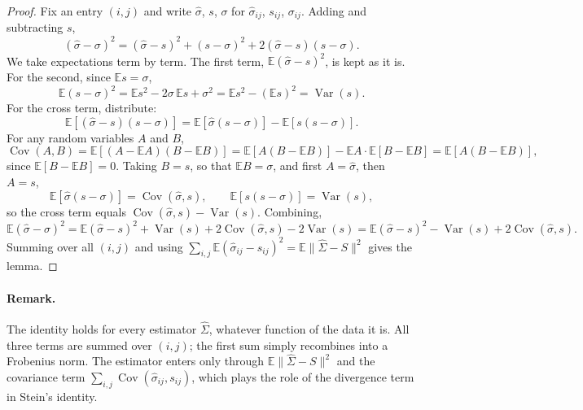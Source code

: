 \begin{proof}
Fix an entry $(i,j)$ and write $\hat\sigma$, $s$, $\sigma$ for $\hat\sigma_{ij}$, $s_{ij}$, $\sigma_{ij}$. Adding and subtracting $s$,
\[
  (\hat\sigma - \sigma)^2
  = (\hat\sigma - s)^2 + (s - \sigma)^2 + 2(\hat\sigma - s)(s - \sigma).
\]
We take expectations term by term. The first term, $\mathbb{E}(\hat\sigma - s)^2$, is kept as it is. For the second, since $\mathbb{E}s = \sigma$,
\[
  \mathbb{E}(s-\sigma)^2 = \mathbb{E}s^2 - 2\sigma\,\mathbb{E}s + \sigma^2 = \mathbb{E}s^2 - (\mathbb{E}s)^2 = \operatorname{Var}(s).
\]
For the cross term, distribute:
\[
  \mathbb{E}\left[(\hat\sigma - s)(s - \sigma)\right]
  = \mathbb{E}\left[\hat\sigma(s-\sigma)\right] - \mathbb{E}\left[s(s-\sigma)\right].
\]
For any random variables $A$ and $B$,
\[
  \operatorname{Cov}(A,B) = \mathbb{E}\left[(A - \mathbb{E}A)(B - \mathbb{E}B)\right]
  = \mathbb{E}\left[A(B - \mathbb{E}B)\right] - \mathbb{E}A \cdot \mathbb{E}\left[B - \mathbb{E}B\right]
  = \mathbb{E}\left[A(B - \mathbb{E}B)\right],
\]
since $\mathbb{E}[B - \mathbb{E}B] = 0$. Taking $B = s$, so that $\mathbb{E}B = \sigma$, and first $A = \hat\sigma$, then $A = s$,
\[
  \mathbb{E}\left[\hat\sigma(s-\sigma)\right] = \operatorname{Cov}(\hat\sigma, s),
  \qquad
  \mathbb{E}\left[s(s-\sigma)\right] = \operatorname{Var}(s),
\]
so the cross term equals $\operatorname{Cov}(\hat\sigma, s) - \operatorname{Var}(s)$. Combining,
\[
  \mathbb{E}(\hat\sigma - \sigma)^2
  = \mathbb{E}(\hat\sigma - s)^2 + \operatorname{Var}(s) + 2\operatorname{Cov}(\hat\sigma, s) - 2\operatorname{Var}(s)
  = \mathbb{E}(\hat\sigma - s)^2 - \operatorname{Var}(s) + 2\operatorname{Cov}(\hat\sigma, s).
\]
Summing over all $(i,j)$ and using $\sum_{i,j}\mathbb{E}(\hat\sigma_{ij} - s_{ij})^2 = \mathbb{E}\|\hat\Sigma - S\|^2$ gives the lemma.
\end{proof}

\paragraph{Remark.}
The identity holds for every estimator $\hat\Sigma$, whatever function of the data it is. All three terms are summed over $(i,j)$; the first sum simply recombines into a Frobenius norm. The estimator enters only through $\mathbb{E}\|\hat\Sigma - S\|^2$ and the covariance term $\sum_{i,j}\operatorname{Cov}(\hat\sigma_{ij}, s_{ij})$, which plays the role of the divergence term in Stein's identity.
